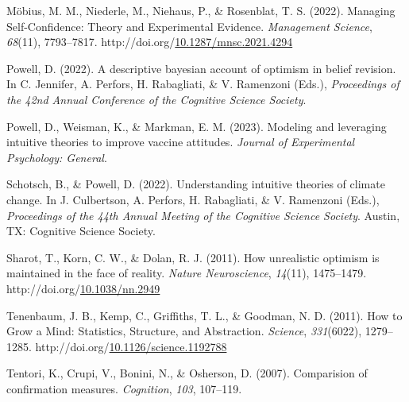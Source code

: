\documentclass[10pt, letterpaper]{article}
\newenvironment{CSLReferences}%
  {}%
  {\par}
\begin{document}
\begin{CSLReferences}
\leavevmode{}%
Möbius, M. M., Niederle, M., Niehaus, P., \& Rosenblat, T. S. (2022).
Managing {Self}-{Confidence}: {Theory} and {Experimental} {Evidence}.
\emph{Management Science}, \emph{68}(11), 7793--7817.
http://doi.org/\href{https://doi.org/10.1287/mnsc.2021.4294}{10.1287/mnsc.2021.4294}

\leavevmode{}%
Powell, D. (2022). A descriptive bayesian account of optimism in belief
revision. In C. Jennifer, A. Perfors, H. Rabagliati, \& V. Ramenzoni
(Eds.), \emph{Proceedings of the 42nd {Annual} {Conference} of the
{Cognitive} {Science} {Society}}.

\leavevmode{}%
Powell, D., Weisman, K., \& Markman, E. M. (2023). Modeling and
leveraging intuitive theories to improve vaccine attitudes.
\emph{Journal of Experimental Psychology: General}.

\leavevmode{}%
Schotsch, B., \& Powell, D. (2022). Understanding intuitive theories of
climate change. In J. Culbertson, A. Perfors, H. Rabagliati, \& V.
Ramenzoni (Eds.), \emph{Proceedings of the 44th {Annual} {Meeting} of
the {Cognitive} {Science} {Society}}. Austin, TX: Cognitive Science
Society.

\leavevmode{}%
Sharot, T., Korn, C. W., \& Dolan, R. J. (2011). How unrealistic
optimism is maintained in the face of reality. \emph{Nature
Neuroscience}, \emph{14}(11), 1475--1479.
http://doi.org/\href{https://doi.org/10.1038/nn.2949}{10.1038/nn.2949}

\leavevmode{}%
Tenenbaum, J. B., Kemp, C., Griffiths, T. L., \& Goodman, N. D. (2011).
How to {Grow} a {Mind}: {Statistics}, {Structure}, and {Abstraction}.
\emph{Science}, \emph{331}(6022), 1279--1285.
http://doi.org/\href{https://doi.org/10.1126/science.1192788}{10.1126/science.1192788}

\leavevmode{}%
Tentori, K., Crupi, V., Bonini, N., \& Osherson, D. (2007). Comparision
of confirmation measures. \emph{Cognition}, \emph{103}, 107--119.

\end{CSLReferences}


\end{document}
